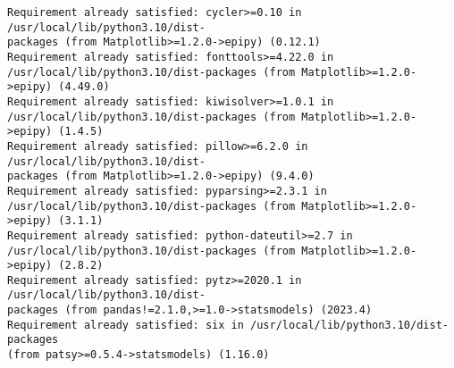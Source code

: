 \documentclass[11pt]{article}
\begin{document}
\begin{Verbatim}[commandchars=\\\{\}]
Requirement already satisfied: cycler>=0.10 in /usr/local/lib/python3.10/dist-
packages (from Matplotlib>=1.2.0->epipy) (0.12.1)
Requirement already satisfied: fonttools>=4.22.0 in
/usr/local/lib/python3.10/dist-packages (from Matplotlib>=1.2.0->epipy) (4.49.0)
Requirement already satisfied: kiwisolver>=1.0.1 in
/usr/local/lib/python3.10/dist-packages (from Matplotlib>=1.2.0->epipy) (1.4.5)
Requirement already satisfied: pillow>=6.2.0 in /usr/local/lib/python3.10/dist-
packages (from Matplotlib>=1.2.0->epipy) (9.4.0)
Requirement already satisfied: pyparsing>=2.3.1 in
/usr/local/lib/python3.10/dist-packages (from Matplotlib>=1.2.0->epipy) (3.1.1)
Requirement already satisfied: python-dateutil>=2.7 in
/usr/local/lib/python3.10/dist-packages (from Matplotlib>=1.2.0->epipy) (2.8.2)
Requirement already satisfied: pytz>=2020.1 in /usr/local/lib/python3.10/dist-
packages (from pandas!=2.1.0,>=1.0->statsmodels) (2023.4)
Requirement already satisfied: six in /usr/local/lib/python3.10/dist-packages
(from patsy>=0.5.4->statsmodels) (1.16.0)
    \end{Verbatim}

    \begin{center}
    \end{center}
    { \hspace*{\fill} \\}
    
\end{document}
